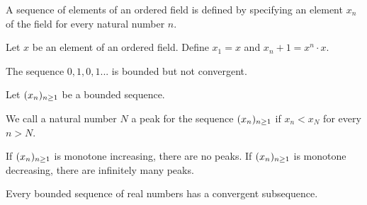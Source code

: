 \begin{definition}[Sequence]
    A sequence of elements of an ordered field is defined by 
    specifying an element $x_n$ of the field for every natural number $n$.
\end{definition}


\begin{example}
    Let $x$ be an element of an ordered field. Define $x_1 = x$ and 
    $x_n+1 = x^n \cdot x$.
\end{example}


\begin{example}
    The sequence $0,1,0,1...$ is bounded but not convergent.
\end{example}


\begin{defn}[Peak]
    Let $(x_n)_{n\geq1}$ be a bounded sequence. 

    We call a natural number $N$ a peak for the sequence $(x_n)_{n\geq1}$ if $x_n < x_N$
    for every $n > N$.

    If $(x_n)_{n\geq1}$ is monotone increasing, there are no peaks. If $(x_n)_{n\geq1}$ is monotone
    decreasing, there are infinitely many peaks.
\end{defn}


\begin{theorem}
    Every bounded sequence of real numbers has a convergent subsequence.
\end{theorem}
